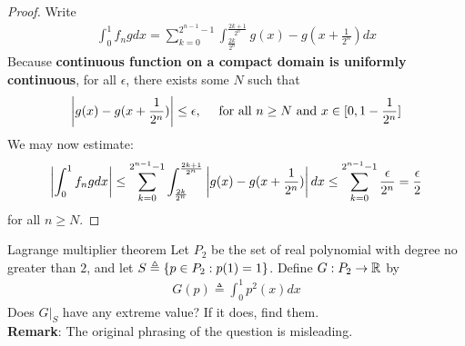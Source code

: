 \documentclass{report}
\begin{document}
\begin{proof}
Write
\begin{align*}
\int_0^1 f_ngdx= \sum_{k=0}^{2^{n-1}-1} \int_{\frac{2k}{2^n}}^{\frac{2k+1}{2^n}} g(x)- g(x+ \frac{1}{2^n}) dx 
\end{align*}
Because  \textbf{continuous function on a compact domain is uniformly continuous}, for all $\epsilon $, there exists some $N$ such that
\begin{align*}
\left|g(x)-g(x+ \frac{1}{2^n})\right| \leq \epsilon ,\quad \text{ for all }n\geq N\text{ and }x \in [0,1-\frac{1}{2^n}]
\end{align*}
We may now estimate: 
\begin{align*}
\left|\int_0^1f_ngdx\right|\leq \sum_{k=0}^{2^{n-1}-1} \int_{\frac{2k}{2^n}}^{\frac{2k+1}{2^n}} \left|g(x)-g(x+\frac{1}{2^n})\right| dx \leq \sum_{k=0}^{2^{n-1}-1} \frac{\epsilon }{2^n}= \frac{\epsilon }{2}
\end{align*}
for all $n\geq N$. 
\end{proof}
\begin{question}{Lagrange multiplier theorem}{}
Let $P_2$ be the set of real polynomial with degree no greater than  $2$, and let $S\triangleq \left\{ p \in P_2: p(1)=1 \right\}$. Define $G:P_2\rightarrow \mathbb{R}$ by 
\begin{align*}
G(p)\triangleq \int_0^1 p^2(x)dx
\end{align*}
Does $G|_S$ have any extreme value? If it does, find them.\\ 

\textbf{Remark}: The original phrasing of the question is misleading. 
\end{question}
\end{document}
